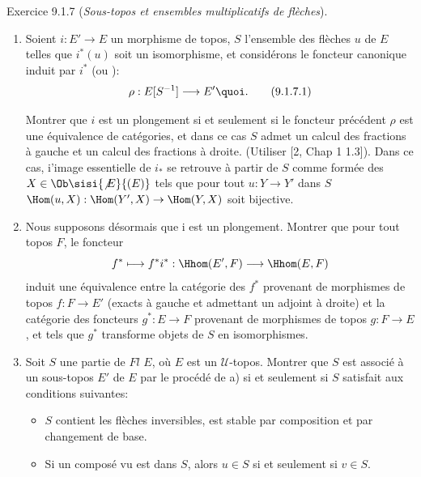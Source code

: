 \begin{enonce*}[remark]{Exercice 9.1.7}
(\emph{Sous-topos et ensembles multiplicatifs de flèches}).

\begin{enumerate}
\renewcommand{\theenumi}{\alph{enumi}}
\renewcommand{\labelenumi}{\theenumi)}
\item Soient $i:E'\rightarrow E$ un morphisme de topos, $S$ l'ensemble des
flèches $u$ de $E$ telles que $i^{\ast}(u)$ soit un isomorphisme, et
considérons le foncteur canonique induit par $i^{\ast}$ (\cf [2,
Chap I] ou ):
\begin{equation*}
\rho:E[S^{-1}]\longrightarrow E'{\quoi}.\tag{9.1.7.1}
\end{equation*}

Montrer que $i$ est un plongement si et seulement si le foncteur
précédent $\rho$ est une équivalence de catégories, et dans ce cas
$S$ admet un calcul des fractions à gauche et un calcul des
fractions à droite. (Utiliser [2, Chap 1 1.3]). Dans ce cas, i'image
essentielle de $i_{\ast}$ se retrouve à partir de $S$ comme formée
des $X\in \Ob \sisi{\not{E}}{(E)}$ tels que pour tout\pageoriginale
$u:Y\rightarrow Y'$ dans $S$ $\Hom(u,X):\Hom(Y',X)\rightarrow
\Hom(Y,X)$ soit bijective.

\item Nous supposons désormais que i est un plongement. Montrer que
pour tout topos $F$, le foncteur
$$
f^{\ast}\longmapsto f^{\ast}i^{\ast}:\Hhom(E',F)\longrightarrow
\Hhom(E,F)
$$
induit une équivalence entre la catégorie des $f^{\ast}$ provenant
de morphismes de topos $f:F\rightarrow E'$ (\ie exacts à gauche et
admettant un adjoint à droite) et la catégorie des foncteurs
$g^{\ast}:E\rightarrow F$ provenant de morphismes de topos
$g:F\rightarrow E$, et tels que $g^{\ast}$ transforme objets de $S$
en isomorphismes.

\item Soit $S$ une partie de $Fl$ $E$, où $E$ est un
$𝒰$-topos. Montrer que $S$ est associé à un sous-topos $E'$
de $E$ par le procédé de a) si et seulement si $S$ satisfait aux
conditions suivantes:
\begin{itemize}
\item[ST 1)] $S$ contient les flèches inversibles, est stable par
composition et par changement de base.

\item[ST 2)] Si un composé vu est dans $S$, alors $u\in S$ si et
seulement si $v\in S$.


\end{itemize}
\end{enumerate}
\end{enonce*}
